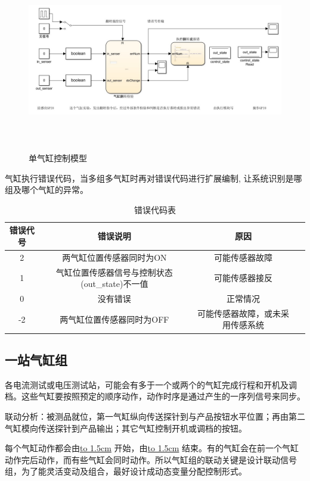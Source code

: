 \documentclass[utf8]{ctexart}
\begin{document}
\begin{figure}[htbp]
\centering
\includegraphics[height=8.0cm,width=15cm]{imgs/dqg.jpg}
\caption{单气缸控制模型}
\end{figure}

气缸执行错误代码，当多组多气缸时再对错误代码进行扩展编制, 让系统识别是哪组及哪个气缸的异常。
\begin{table}[!htbp]
	\centering
	\begin{tabular}{cccc}
	\toprule
	错误代号&错误说明&原因\\  \hline
		2&两气缸位置传感器同时为ON&可能传感器故障\\
		1&气缸位置传感器信号与控制状态(out\_state)不一值&可能传感器接反\\
		0&没有错误&正常情况\\
		-2&两气缸位置传感器同时为OFF&可能传感器故障，或未采用传感系统\\
	\bottomrule
	\end{tabular}
	\caption{错误代码表}
\end{table}


\subsection{一站气缸组}
各电流测试或电压测试站，可能会有多于一个或两个的气缸完成行程和开机及调档。这些气缸要按照预定的顺序动作，动作时序是通过产生的一序列信号来同步。

联动分析：被测品就位，第一气缸纵向传送探针到与产品按钮水平位置；再由第二气缸模向传送探针到产品输出；其它气缸控制开机或调档的按钮。

每个气缸动作都会由\underline{\hbox to 1.5cm{}}        开始，由\underline{\hbox to 1.5cm{}}     结束。有的气缸会在前一个气缸动作完后动作，而有些气缸会同时动作。所以气缸组的联动关键是设计联动信号组，为了能灵活变动及组合，最好设计成动态变量分配控制形式。
\end{document}
